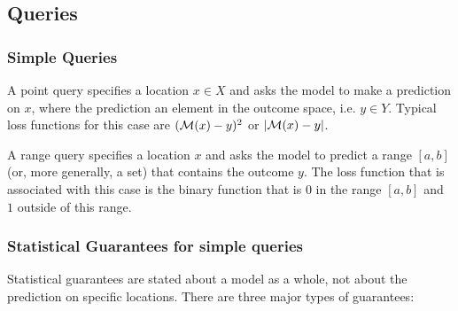 \subsection{Queries}

\subsubsection{Simple Queries}

A point query specifies a location $x \in X$ and asks the model to
make a prediction on $x$, where the prediction an element in the
outcome space, i.e. $y \in Y$. Typical loss functions for this case
are $(\cM(x)-y)^2$ or $|\cM(x)-y|$.

A range query specifies a location $x$ and asks the model to predict a
range $[a,b]$ (or, more generally, a set) that contains the outcome
$y$. The loss function that is associated with this case is the binary
function that is $0$ in the range $[a,b]$ and $1$ outside of this
range.

\subsubsection{Statistical Guarantees for simple queries}

Statistical guarantees are stated about a model as a whole, not about
the prediction on specific locations. There are three major types of
guarantees:

